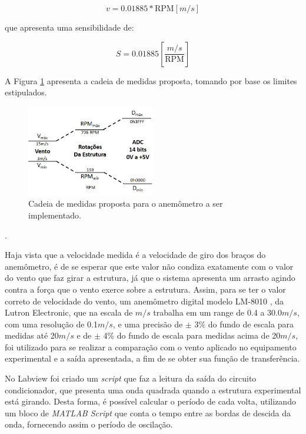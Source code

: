 \documentclass[a4paper]{instrumentacao}
\begin{document}
\begin{equation}
	v=0.01885*\mathrm{RPM} [m/s]
	\label{eq:anemometro-FT-proposta}
\end{equation}

\noindent que apresenta uma sensibilidade de:

\begin{equation}
	S=0.01885 \left [ \frac{m/s}{\mathrm{RPM}} \right ]
	\label{eq:anemometro-sensibilidade-proposta}
\end{equation}

A Figura \ref{fig:anemometro-cadeia-medidas-proposta} apresenta a cadeia de medidas proposta, tomando por base os limites estipulados.

\begin{figure}[H]
	\centering \includegraphics[width=0.5\textwidth]{anemometro-cadeia-medidas-proposta.jpg}
	\caption{Cadeia de medidas proposta para o anemômetro a ser implementado.}
	\label{fig:anemometro-cadeia-medidas-proposta}
\end{figure}.

Haja vista que a velocidade medida é a velocidade de giro dos braços do anemômetro, é de se esperar que este valor não condiza exatamente com o valor do vento que faz girar a estrutura, já que o sistema apresenta um arrasto agindo contra a força que o vento exerce sobre a estrutura. Assim, para se ter o valor correto de velocidade do vento, um anemômetro digital modelo LM-8010 \cite{anemometro-manual}, da Lutron Electronic, que na escala de $m/s$ trabalha em um range de 0.4 a 30.0$m/s$, com uma resolução de 0.1$m/s$, e uma precisão de $\pm$ 3$\%$ do fundo de escala para medidas até 20$m/s$ e de $\pm$ 4$\%$ do fundo de escala para medidas acima de 20$m/s$, foi utilizado para se realizar a comparação com o vento aplicado no equipamento experimental e a saída apresentada, a fim de se obter sua função de transferência.

No Labview foi criado um \textit{script} que faz a leitura da saída do circuito condicionador, que presenta uma onda quadrada quando a estrutura experimental está girando. Desta forma, é possível calcular o período de cada volta, utilizando um bloco de \textit{MATLAB Script} que conta o tempo entre as bordas de descida da onda, fornecendo assim o período de oscilação.
\end{document}
